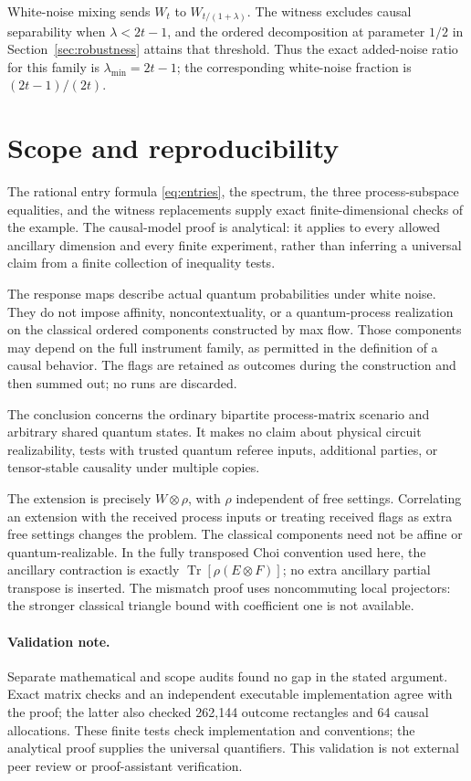 \documentclass[11pt,letterpaper]{article}
\theoremstyle{remark}\newtheorem{remark}[theorem]{Remark}
\newcommand{\Tr}{\operatorname{Tr}}
\begin{document}
White-noise mixing sends $W_t$ to $W_{t/(1+\lambda)}$. The witness excludes
causal separability when $\lambda<2t-1$, and the ordered decomposition at
parameter $1/2$ in Section~\ref{sec:robustness} attains that threshold. Thus
the exact added-noise ratio for this family is $\lambda_{\min}=2t-1$;
the corresponding white-noise fraction is $(2t-1)/(2t)$.

\section{Scope and reproducibility}\label{sec:scope}

The rational entry formula \eqref{eq:entries}, the spectrum, the three process-subspace equalities, and the witness replacements supply exact finite-dimensional checks of the example. The causal-model proof is analytical: it applies to every allowed ancillary dimension and every finite experiment, rather than inferring a universal claim from a finite collection of inequality tests.

The response maps describe actual quantum probabilities under white noise. They do not impose affinity, noncontextuality, or a quantum-process realization on the classical ordered components constructed by max flow. Those components may depend on the full instrument family, as permitted in the definition of a causal behavior. The flags are retained as outcomes during the construction and then summed out; no runs are discarded.

The conclusion concerns the ordinary bipartite process-matrix scenario and arbitrary shared quantum states. It makes no claim about physical circuit realizability, tests with trusted quantum referee inputs, additional parties, or tensor-stable causality under multiple copies.

The extension is precisely $W\otimes\rho$, with $\rho$ independent of free
settings. Correlating an extension with the received process inputs or treating
received flags as extra free settings changes the problem. The classical
components need not be affine or quantum-realizable. In the fully transposed
Choi convention used here, the ancillary contraction is exactly
$\Tr[\rho(E\otimes F)]$; no extra ancillary partial transpose is inserted.
The mismatch proof uses noncommuting local projectors: the stronger classical
triangle bound with coefficient one is not available.

\paragraph{Validation note.}
Separate mathematical and scope audits found no gap in the stated argument. Exact matrix checks and an independent executable implementation agree with the proof; the latter also checked 262,144 outcome rectangles and 64 causal allocations. These finite tests check implementation and conventions; the analytical proof supplies the universal quantifiers. This validation is not external peer review or proof-assistant verification.
\end{document}
